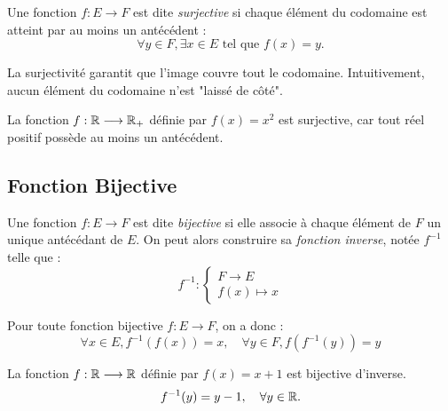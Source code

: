\begin{definition}
    Une fonction $f : E \longrightarrow F$ est dite \emph{surjective} si chaque élément du codomaine est atteint par au moins un antécédent :
    \[
        \forall y \in F, \exists x \in E \text{ tel que } f(x) = y.
    \]
\end{definition}

\begin{remark}
    La surjectivité garantit que l'image couvre tout le codomaine. Intuitivement, aucun élément du codomaine n'est "laissé de côté".
\end{remark}

\begin{example}
    La fonction $f : \mathbb{R} \longrightarrow \mathbb{R}_+$ définie par $f(x) = x^2$ est surjective, car tout réel positif possède au moins un antécédent.
\end{example}


\subsection{Fonction Bijective}

\begin{definition}
    Une fonction $f : E \longrightarrow F$ est dite \emph{bijective} si elle associe 
    à chaque élément de $F$ un unique antécédant de $E$. 
    On peut alors construire sa \emph{fonction inverse}, notée $f^{-1}$ telle que : 
        \[ f^{-1} : 
            \begin{cases}
                F \longrightarrow E \\ 
                f(x) \longmapsto x 
            \end{cases} \] 
\end{definition}

\begin{proposition}
    Pour toute fonction bijective $f : E \longrightarrow F$, on a donc : 
        \[ \forall x \in E, f^{-1}(f(x)) = x, \quad \forall y \in F, f(f^{-1}(y)) = y \] 
\end{proposition}

\begin{example}
    La fonction $f : \mathbb{R} \longrightarrow \mathbb{R}$ définie par $f(x) = x + 1$ est bijective d'inverse. 
    \[
        f^{-1}(y) = y-1, \quad \forall y \in \mathbb{R}.
    \]
\end{example}

